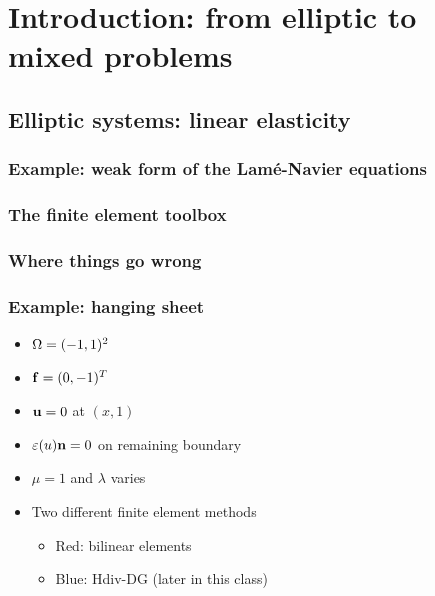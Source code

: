 \documentclass[american,ignorenonframetext,notheorems]{beamer}
\begin{document}
\section{Introduction: from elliptic to mixed problems}
\subsection{Elliptic systems: linear elasticity}
\subsubsection{Example: weak form of the Lamé-Navier equations}
\subsubsection{The finite element toolbox}
\subsubsection{Where things go wrong}

\begin{frame}
  \frametitle{Example: hanging sheet}
  \begin{itemize}
  \item $\Omega = (-1,1)^2$
  \item $\mathbf f = (0,-1)^T$
  \item $\mathbf u = 0$ at $(x,1)$
  \item $\varepsilon(u) \mathbf n = 0$ on remaining boundary
  \item $\mu=1$ and $\lambda$ varies
  \item Two different finite element methods
    \begin{itemize}
    \item Red: bilinear elements
    \item Blue: Hdiv-DG (later in this class)
    \end{itemize}
  \end{itemize}
\end{frame}
\end{document}
